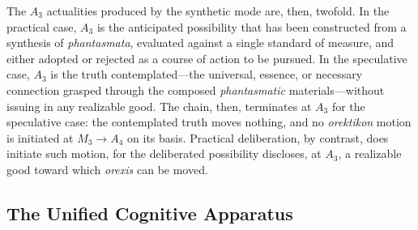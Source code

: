 The $A_3$ actualities produced by the synthetic mode are, then, twofold. In the practical case, $A_3$ is the anticipated possibility that has been constructed from a synthesis of \textit{phantasmata}, evaluated against a single standard of measure, and either adopted or rejected as a course of action to be pursued. In the speculative case, $A_3$ is the truth contemplated---the universal, essence, or necessary connection grasped through the composed \textit{phantasmatic} materials---without issuing in any realizable good. The chain, then, terminates at $A_3$ for the speculative case: the contemplated truth moves nothing, and no \textit{orektikon} motion is initiated at $M_3 \to A_4$ on its basis. Practical deliberation, by contrast, does initiate such motion, for the deliberated possibility discloses, at $A_3$, a realizable good toward which \textit{orexis} can be moved.

\subsection{The Unified Cognitive Apparatus}

